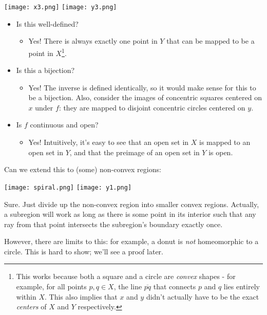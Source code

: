 \documentclass[11pt]{amsart}
\begin{document}
\begin{center}
\texttt{[image: x3.png]}\qquad\quad \raisebox{50pt}{\Huge $\longrightarrow$} \qquad\quad\texttt{[image: y3.png]}
\end{center}
 \pagebreak
\begin{itemize}
\item Is this well-defined?  
\begin{itemize}\item Yes!  There is always exactly one point in $Y$ that can be mapped to be a point in $X$\footnote{This works because both a square and a circle are \emph{convex} shapes - for example, for all points $p,q\in X$, the line $\overline{pq}$ that connects $p$ and $q$ lies entirely within $X$.  This also implies that $x$ and $y$ didn't actually have to be the exact \emph{centers} of $X$ and $Y$ respectively.}.\end{itemize}
\item Is this a bijection? 
\begin{itemize}\item Yes!  The inverse is defined identically, so it would make sense for this to be a bijection.  Also, consider the images of concentric squares centered on $x$ under $f$: they are mapped to disjoint concentric circles centered on $y$.\end{itemize}
\item Is $f$ continuous and open?
\begin{itemize}
\item Yes!  Intuitively, it's easy to see that an open set in $X$ is mapped to an open set in $Y$, and that the preimage of an open set in $Y$ is open.
\end{itemize}
\end{itemize}

Can we extend this to (some) non-convex regions:
\begin{center}
\texttt{[image: spiral.png]}\qquad\quad \raisebox{50pt}{\Huge $\cong$} \qquad\quad\texttt{[image: y1.png]}\qquad\quad \raisebox{50pt}{\Huge ?}
\end{center}
Sure.  Just divide up the non-convex region into smaller convex regions.  Actually, a subregion will work as long as there is some point in its interior such that any ray from that point intersects the subregion's boundary exactly once.

However, there are limits to this: for example, a donut is \emph{not} homeomorphic to a circle.  This is hard to show; we'll see a proof later.
\end{document}
